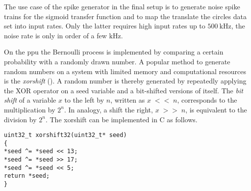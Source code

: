 The use case of the spike generator in the final setup is to generate noise spike trains for the sigmoid transfer function and to map the translate the circles data set into input rates. Only the latter requires high input rates up to $\SI{500}{\kilo \Hz}$, the noise rate is only in order of a few $\si{\kilo \Hz}$.

On the \gls{ppu} the Bernoulli process is implemented by comparing a certain probability with a randomly drawn number. A popular method to generate random numbers on a system with limited memory and computational resources is the \emph{xorshift} (\citealp{marsaglia2003xorshift}). A random number is thereby generated by repeatedly applying the XOR operator on a seed variable and a bit-shifted versions of itself. The \emph{bit shift} of a variable $x$ to the left by $n$, written as $x\;{\scriptstyle<<}\;n$, corresponds to the multiplication by $2^n$. In analogy, a shift the right, $x\;{\scriptstyle>>}\;n$, is equivalent to the division by $2^n$. The xorshift can be implemented in C as follows.

\begin{verbatim}
uint32_t xorshift32(uint32_t* seed)
{
*seed ^= *seed << 13;
*seed ^= *seed >> 17;
*seed ^= *seed << 5;
return *seed;
}
\end{verbatim}





